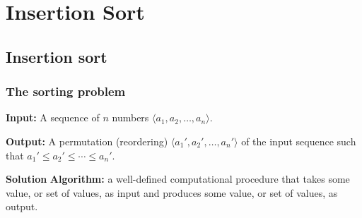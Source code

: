 \documentclass[notes,serif]{beamer}
\begin{document}
%
%
%
%
%
%
%
%

\section{Insertion Sort}

\subsection{Insertion sort}

\begin{frame}
  \frametitle{The sorting problem}
  \begin{block}{}
    {\bf Input:} A sequence of $n$ numbers $\langle a_1, a_2, \dots, a_n \rangle$.
  \end{block}
  \begin{block}{}
    {\bf Output:} A permutation (reordering) $\langle a_1', a_2', \dots, a_n' \rangle$ of the input sequence such that $a_1' \le a_2' \le \cdots \le a_n'$.
  \end{block}
  \begin{alertblock}{\bf Solution}
    {\bf Algorithm:} a well-defined computational procedure that takes some value, or set of values, as input and produces some value, or set of values, as output.
  \end{alertblock}
\end{frame}
\end{document}

